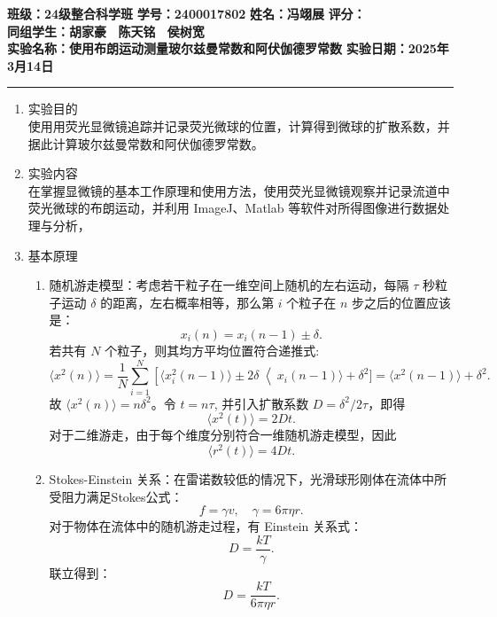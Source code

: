 \documentclass[a4paper]{article}
\begin{document}
\noindent\textbf{班级：24级整合科学班} \hspace{1cm} \textbf{学号：2400017802} \hspace{1cm} \textbf{姓名：冯翊展} \hspace{1cm} \textbf{评分：}\\
\textbf{同组学生：胡家豪 \ 陈天铭 \ 侯树宽} \\
\textbf{实验名称：使用布朗运动测量玻尔兹曼常数和阿伏伽德罗常数}   \hfill \textbf{实验日期：2025年3月14日} 

\hrule
\vspace{3mm}

\begin{enumerate}[label=\chinese*.,left=0pt]
    \item 实验目的
    \\
    使用用荧光显微镜追踪并记录荧光微球的位置，计算得到微球的扩散系数，并据此计算玻尔兹曼常数和阿伏伽德罗常数。
    
    \item 实验内容
    \\
    在掌握显微镜的基本工作原理和使用方法，使用荧光显微镜观察并记录流道中荧光微球的布朗运动，并利用 ImageJ、Matlab 等软件对所得图像进行数据处理与分析，
    
    \item 基本原理
    \begin{enumerate}[label=\arabic*.,left = 0pt]
        \item 随机游走模型：考虑若干粒子在一维空间上随机的左右运动，每隔 $\tau$ 秒粒子运动 $\delta$ 的距离，左右概率相等，那么第 $i$ 个粒子在 $n$ 步之后的位置应该是：
        $$x_i(n) = x_i(n-1)\pm\delta.$$
        若共有 $N$ 个粒子，则其均方平均位置符合递推式:
        $$\langle x^2(n)\rangle = \frac{1}{N} \sum_{i=1}^N \left[ \langle x_i^2(n-1)\rangle \pm 2\delta\right \langle x_i(n-1)\rangle +\delta^2] = \langle x^2(n-1) \rangle + \delta^2.$$
        故 $\langle x^2(n) \rangle = n\delta^2$。令 $t=n\tau$, 并引入扩散系数 $D = \delta^2 / 2\tau$，即得
        $$\langle x^2(t)\rangle = 2Dt.$$
        对于二维游走，由于每个维度分别符合一维随机游走模型，因此
        $$\langle r^2(t) \rangle = 4Dt.$$

        \item Stokes-Einstein 关系：在雷诺数较低的情况下，光滑球形刚体在流体中所受阻力满足Stokes公式：
        $$f = \gamma v, \quad \gamma=6\pi\eta r.$$
        对于物体在流体中的随机游走过程，有 Einstein 关系式：
        $$D= \frac{kT}{\gamma}.$$
        联立得到：
        $$D = \frac{kT}{6\pi\eta r}.$$


\end{enumerate}
\end{enumerate}
\end{document}
